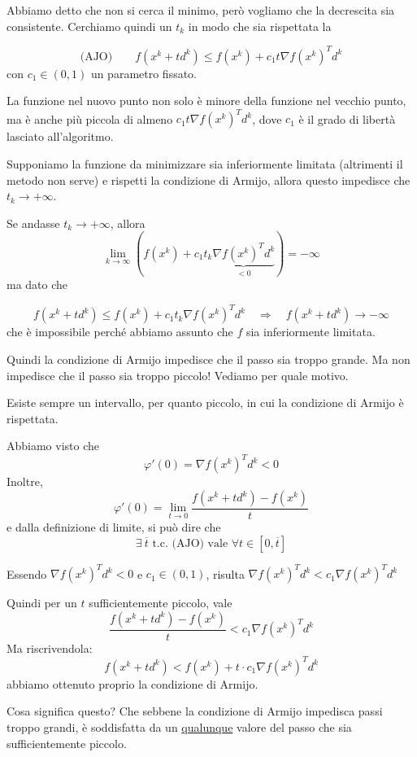 Abbiamo detto che non si cerca il minimo, però vogliamo che la
decrescita sia consistente. Cerchiamo quindi un $t_k$ in modo che sia
rispettata la
\begin{defn}
\label{def:condizione-armijo}
$$  \text{(AJO)} \qquad  f(x^{k}+ td^{k}) \leq  f(x^{k}) + c_1 t \nabla f(x^{k})^{T} d^{k}$$
con $ c_1\in (0,1)$ un parametro fissato.

La funzione nel nuovo punto non solo \`e minore della funzione nel
vecchio punto, ma \`e anche pi\`u piccola di almeno $c_1 t \nabla
f(x^{k})^{T} d^{k}$, dove $c_1$ \`e il grado di libert\`a lasciato
all'algoritmo.
\end{defn}

\begin{property}
\label{prop:armijo-tk-non-infinito} Supponiamo la funzione da
minimizzare sia inferiormente limitata (altrimenti il metodo non
serve) e rispetti la condizione di Armijo, allora questo impedisce che
$ t_k \rightarrow + \infty$.

\begin{thproof} Se andasse $ t_k \rightarrow + \infty$,
allora $$\lim_{k \to \infty} (f(x^{k}) + c_1 t_k \underbrace{\nabla
f(x^{k})^{T}d^{k}}_{<0} ) = -\infty$$ ma dato che

$$f(x^{k} + td^{k}) \leq f(x^{k}) + c_1 t_k \nabla f(x^{k})^{T}d^{k} \quad \Longrightarrow \quad f(x^{k} + td^{k}) \rightarrow -\infty$$
che \`e impossibile perché abbiamo assunto che $f$ sia inferiormente
limitata.
\end{thproof}
\end{property}

Quindi la condizione di Armijo impedisce che il passo sia troppo
grande. Ma non impedisce che il passo sia troppo piccolo! Vediamo per
quale motivo.

\begin{property}
\label{prop:condizione-armijo-sempre-valida-in-intervallo} Esiste
sempre un intervallo, per quanto piccolo, in cui la condizione di
Armijo \`e rispettata.
\begin{thproof} Abbiamo visto che
$$\varphi'(0) = \nabla f(x^{k})^{T} d^{k} < 0 $$
Inoltre,
$$ \varphi'(0) = \lim_{t \to 0} \frac{f(x^{k} + td^{k}) - f(x^{k})}{t}$$
e dalla definizione di limite, si può dire che
$$ \exists  ~ \overline{t} \text{ t.c. (AJO) vale } \forall t \in [ 0, \overline{t}]$$

Essendo $\nabla f (x^k)^T d^k < 0$ e $c_1 \in (0,1)$, risulta $\nabla
f (x^k)^T d^k < c_1 \nabla f (x^k)^T d^k$

Quindi per un $t$ sufficientemente piccolo, vale
$$ \frac{f(x^{k} + td^{k}) - f(x^{k})}{t} < c_1 \nabla f (x^k)^T d^k $$
Ma riscrivendola:
$$ f(x^{k} + td^{k}) < f(x^{k}) + t \cdot c_1 \nabla f (x^k)^T d^k $$
abbiamo ottenuto proprio la condizione di Armijo.
\end{thproof}
\end{property} Cosa significa questo? Che sebbene la condizione di
Armijo impedisca passi troppo grandi, \`e soddisfatta da un
\underline{qualunque} valore del passo che sia sufficientemente
piccolo.

